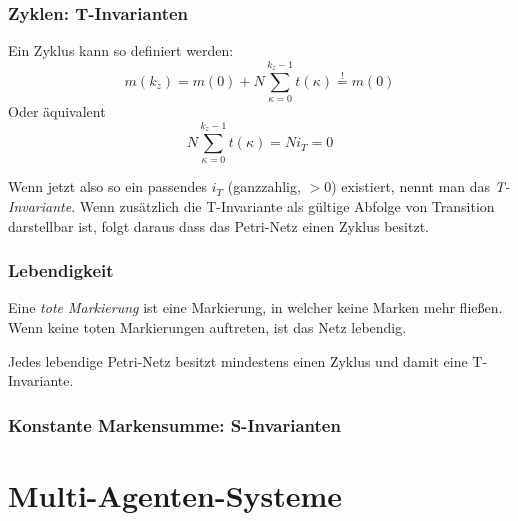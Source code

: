 \documentclass[a4paper]{book}
\begin{document}
\subsection{Zyklen: T-Invarianten}
Ein Zyklus kann so definiert werden:
\begin{equation}
    m(k_z) = m(0) + N \sum_{\kappa=0}^{k_z-1} t(\kappa) \overset{!}{=} m(0)
\end{equation}
Oder äquivalent
\begin{equation}
    N \sum_{\kappa=0}^{k_z-1} t(\kappa) = N i_T = 0
\end{equation}

Wenn jetzt also so ein passendes $i_T$ (ganzzahlig, $>0$) existiert,
nennt man das \emph{T-Invariante}.
Wenn zusätzlich die T-Invariante als gültige Abfolge von Transition darstellbar ist,
folgt daraus dass das Petri-Netz einen Zyklus besitzt.

\subsection{Lebendigkeit}
Eine \emph{tote Markierung} ist eine Markierung, in welcher keine Marken mehr fließen.
Wenn keine toten Markierungen auftreten, ist das Netz lebendig.

Jedes lebendige Petri-Netz besitzt mindestens einen Zyklus und damit eine T-Invariante.

\subsection{Konstante Markensumme: S-Invarianten}


\chapter{Multi-Agenten-Systeme}
\end{document}

